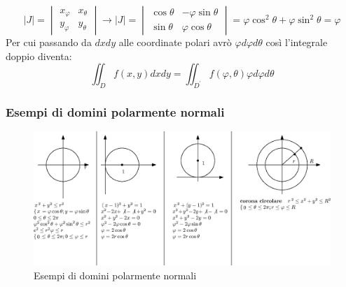 \documentclass{book}
\newcommand{\abs}[1]{\lvert#1\rvert}
\begin{document}
\begin{itemize}
\begin{equation}
     \abs{J}=\begin{vmatrix}
               x_\varphi & x_\theta\\
               y_\varphi & y_\theta
             \end{vmatrix}
             \to \abs{J}=\begin{vmatrix}
                           \cos \theta & -\varphi \sin \theta\\
                           \sin \theta & \varphi \cos \theta
                         \end{vmatrix}
                         =\varphi\cos^2\theta+\varphi \sin^2\theta =\varphi
   \end{equation} 
   Per cui passando da $dxdy$ alle coordinate polari avrò $\varphi d\varphi d\theta$ così
   l'integrale doppio diventa:
   \begin{equation*}
     \iint_Df(x,y)dxdy=\iint_{D^\prime}f(\varphi,\theta)\varphi d\varphi d\theta
   \end{equation*}
\end{itemize}
\clearpage
\subsubsection{Esempi di domini polarmente normali}
\begin{figure}[ht]
  \centering
  \includegraphics[width=14cm]{img/finiti/esdompolnorm.eps}
  \caption{Esempi di domini polarmente normali}
\end{figure}
\end{document}
